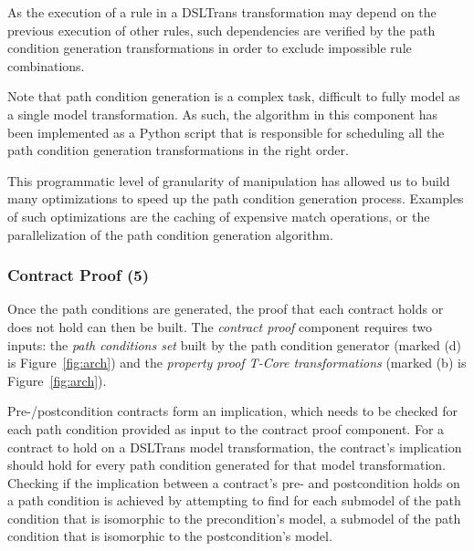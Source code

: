 As the execution of a rule in a DSLTrans transformation may depend on the
previous execution of other rules, such dependencies are verified by the path
condition generation transformations in order to exclude impossible rule
combinations.


Note that path condition generation is a complex task, difficult to fully model
as a single model transformation.
As such, the algorithm in this component has been implemented as a Python script
that is responsible for scheduling all the path condition generation
transformations in the right order.

This programmatic level of granularity of manipulation has allowed us to build
many optimizations to speed up the path condition generation process. Examples
of such optimizations are the caching of expensive match operations, or the
parallelization of the path condition generation algorithm.
 
\subsubsection{Contract Proof (5)}

Once the path conditions are generated, the proof that each contract holds or
does not hold can then be built. The \emph{contract proof} component requires
two inputs: the \emph{path conditions set} built by the path condition generator
(marked (d) is Figure~\ref{fig:arch}) and the \emph{property proof T-Core
transformations} (marked (b) is Figure~\ref{fig:arch}).

Pre-/postcondition contracts form an implication, which needs to be checked for
each path condition provided as input to the contract proof component. For a
contract to hold on a DSLTrans model transformation, the contract's implication
should hold for every path condition generated for that model transformation.
Checking if the implication between a contract's pre- and postcondition holds on
a path condition is achieved by attempting to find for each submodel of the path
condition that is isomorphic to the precondition's model, a submodel of the path
condition that is isomorphic to the postcondition's model.

